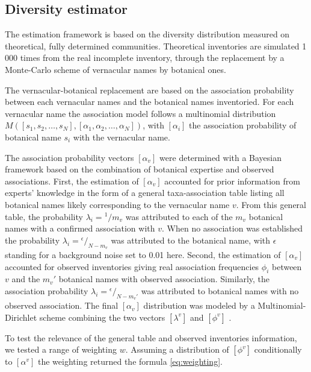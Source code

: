 \documentclass[fleqn,10pt]{ArtEcoFoG} %
\begin{document}
\subsection{Diversity estimator}\label{diversity-estimator}

The estimation framework is based on the diversity distribution measured
on theoretical, fully determined communities. Theoretical inventories
are simulated 1 000 times from the real incomplete inventory, through
the replacement by a Monte-Carlo scheme of vernacular names by botanical
ones.

The vernacular-botanical replacement are based on the association
probability between each vernacular names and the botanical names
inventoried. For each vernacular name the association model follows a
multinomial distribution
\(M([s_1, s_2, …, s_N] ,[\alpha_1, \alpha_2,…, \alpha_N])\), with
\([\alpha_i]\) the association probability of botanical name \(s_i\)
with the vernacular name.

The association probability vectors \([\alpha_v]\) were determined with
a Bayesian framework based on the combination of botanical expertise and
observed associations. First, the estimation of \([\alpha_v]\) accounted
for prior information from experts' knowledge in the form of a general
taxa-association table listing all botanical names likely corresponding
to the vernacular name \(v\). From this general table, the probability
\(\lambda_i={}^1/m_v\) was attributed to each of the \(m_v\) botanical
names with a confirmed association with \(v\). When no association was
established the probability \(\lambda_i={}^\epsilon\big/_{N-m_v}\) was
attributed to the botanical name, with \(\epsilon\) standing for a
background noise set to 0.01 here. Second, the estimation of
\([\alpha_v]\) accounted for observed inventories giving real
association frequencies \(\phi_i\) between \(v\) and the \(m_v'\)
botanical names with observed association. Similarly, the association
probability \(\lambda_i={}^\epsilon\big/_{N-m_v'}\) was attributed to
botanical names with no observed association. The final \([\alpha_v]\)
distribution was modeled by a Multinomial-Dirichlet scheme combining the
two vectors \([\lambda^v]\) and \([\phi^v]\) \citep{McCarthy2007}.

To test the relevance of the general table and observed inventories
information, we tested a range of weighting \(w\). Assuming a
distribution of \([\phi^v]\) conditionally to \([\alpha^v]\) the
weighting returned the formula \eqref{eq:weighting}.
\end{document}
